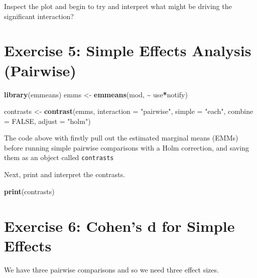 \documentclass[
]{book}
\newenvironment{Shaded}{\begin{snugshade}}{\end{snugshade}}
\newcommand{\AttributeTok}[1]{\textcolor[rgb]{0.13,0.29,0.53}{#1}}
\newcommand{\ConstantTok}[1]{\textcolor[rgb]{0.56,0.35,0.01}{#1}}
\newcommand{\FunctionTok}[1]{\textcolor[rgb]{0.13,0.29,0.53}{\textbf{#1}}}
\newcommand{\NormalTok}[1]{#1}
\newcommand{\OtherTok}[1]{\textcolor[rgb]{0.56,0.35,0.01}{#1}}
\newcommand{\SpecialCharTok}[1]{\textcolor[rgb]{0.81,0.36,0.00}{\textbf{#1}}}
\newcommand{\StringTok}[1]{\textcolor[rgb]{0.31,0.60,0.02}{#1}}
\let\oldsection\section
\renewcommand{\section}{\needspace{5\baselineskip}\oldsection}
\begin{document}
Inspect the plot and begin to try and interpret what might be driving the significant interaction?

\section{Exercise 5: Simple Effects Analysis (Pairwise)}\label{exercise-5-simple-effects-analysis-pairwise}

\begin{Shaded}
\begin{Highlighting}[]
\FunctionTok{library}\NormalTok{(emmeans)}
\NormalTok{emms }\OtherTok{\textless{}{-}} \FunctionTok{emmeans}\NormalTok{(mod, }\SpecialCharTok{\textasciitilde{}}\NormalTok{ use}\SpecialCharTok{*}\NormalTok{notify)}

\NormalTok{contrasts }\OtherTok{\textless{}{-}} \FunctionTok{contrast}\NormalTok{(emms,}
          \AttributeTok{interaction =} \StringTok{"pairwise"}\NormalTok{, }
          \AttributeTok{simple =} \StringTok{"each"}\NormalTok{, }
          \AttributeTok{combine =} \ConstantTok{FALSE}\NormalTok{, }
          \AttributeTok{adjust =} \StringTok{"holm"}\NormalTok{)}
\end{Highlighting}
\end{Shaded}

The code above with firstly pull out the estimated marginal means (EMMs) before running simple pairwise comparisons with a Holm correction, and saving them as an object called \texttt{contrasts}

Next, print and interpret the contrasts.

\begin{Shaded}
\begin{Highlighting}[]
\FunctionTok{print}\NormalTok{(contrasts)}
\end{Highlighting}
\end{Shaded}

\section{Exercise 6: Cohen's d for Simple Effects}\label{exercise-6-cohens-d-for-simple-effects}

We have three pairwise comparisons and so we need three effect sizes.
\end{document}
